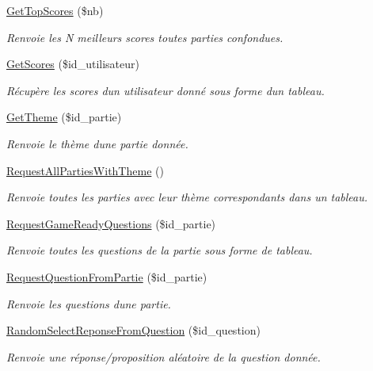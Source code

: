\begin{DoxyCompactItemize}
\mbox{\hyperlink{class_interface_b_d_d_a3c8410b12dc8ab5319af2f9b95248658}{Get\+Top\+Scores}} (\$nb)
\begin{DoxyCompactList}\small\item\em Renvoie les N meilleurs scores toutes parties confondues. \end{DoxyCompactList}\item 
\mbox{\hyperlink{class_interface_b_d_d_a0bed09747595044e2aef3e3ce363c126}{Get\+Scores}} (\$id\+\_\+utilisateur)
\begin{DoxyCompactList}\small\item\em Récupère les scores d\textquotesingle{}un utilisateur donné sous forme d\textquotesingle{}un tableau. \end{DoxyCompactList}\item 
\mbox{\hyperlink{class_interface_b_d_d_aa0363b9684feb940bb3ad88fc322bdc8}{Get\+Theme}} (\$id\+\_\+partie)
\begin{DoxyCompactList}\small\item\em Renvoie le thème d\textquotesingle{}une partie donnée. \end{DoxyCompactList}\item 
\mbox{\hyperlink{class_interface_b_d_d_a9d671df2428c378fcb683f587e2a62d5}{Request\+All\+Parties\+With\+Theme}} ()
\begin{DoxyCompactList}\small\item\em Renvoie toutes les parties avec leur thème correspondants dans un tableau. \end{DoxyCompactList}\item 
\mbox{\hyperlink{class_interface_b_d_d_ab3cac1dc81aaa3b978c19e40f585139d}{Request\+Game\+Ready\+Questions}} (\$id\+\_\+partie)
\begin{DoxyCompactList}\small\item\em Renvoie toutes les questions de la partie sous forme de tableau. \end{DoxyCompactList}\item 
\mbox{\hyperlink{class_interface_b_d_d_a9135bab40bcea0ecd11a167be9442445}{Request\+Question\+From\+Partie}} (\$id\+\_\+partie)
\begin{DoxyCompactList}\small\item\em Renvoie les questions d\textquotesingle{}une partie. \end{DoxyCompactList}\item 
\mbox{\hyperlink{class_interface_b_d_d_a0ef10a6954ec4add81d8a602bb70bd03}{Random\+Select\+Reponse\+From\+Question}} (\$id\+\_\+question)
\begin{DoxyCompactList}\small\item\em Renvoie une réponse/proposition aléatoire de la question donnée. \end{DoxyCompactList}\end{DoxyCompactItemize}



